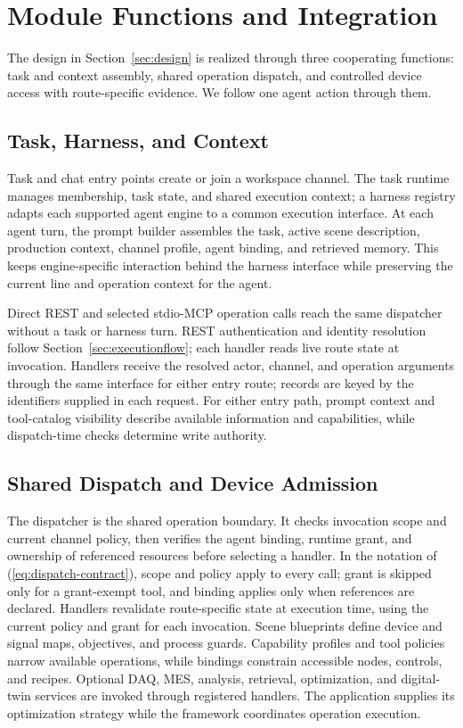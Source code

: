 \section{Module Functions and Integration}
\label{sec:modules}
The design in Section~\ref{sec:design} is realized through three cooperating functions:
task and context assembly, shared operation dispatch, and controlled device
access with route-specific evidence. We follow one agent action through them.

\subsection{Task, Harness, and Context}
Task and chat entry points create or join a workspace channel. The task
runtime manages membership, task state, and shared execution context; a
harness registry adapts each supported agent engine to a common execution
interface. At each agent turn, the prompt builder assembles the task, active
scene description, production context, channel profile, agent binding, and
retrieved memory. This keeps engine-specific interaction behind the harness
interface while preserving the current line and operation context for the
agent.

Direct REST and selected stdio-MCP operation calls reach the same dispatcher
without a task or harness turn. REST authentication and identity resolution
follow Section~\ref{sec:executionflow}; each handler reads live route state
at invocation. Handlers receive the resolved actor, channel, and operation
arguments through the same interface for either entry route; records are keyed
by the identifiers supplied in each request. For either entry path,
prompt context and tool-catalog visibility describe available information and
capabilities, while dispatch-time checks determine write authority.

\subsection{Shared Dispatch and Device Admission}
\label{sec:governed}
The dispatcher is the shared operation boundary. It checks invocation scope
and current channel policy, then verifies the agent binding, runtime grant,
and ownership of referenced resources before selecting a handler. In the
notation of (\ref{eq:dispatch-contract}), scope and policy apply to every
call; grant is skipped only for a grant-exempt tool, and binding applies only
when references are declared. Handlers revalidate route-specific state at
execution time, using the current policy and grant for each invocation.
Scene blueprints define device and signal maps, objectives, and process
guards. Capability profiles and tool policies narrow available operations,
while bindings constrain accessible nodes, controls, and recipes. Optional
DAQ, MES, analysis, retrieval, optimization, and digital-twin services are
invoked through registered handlers. The application supplies its optimization
strategy while the framework coordinates operation execution.

